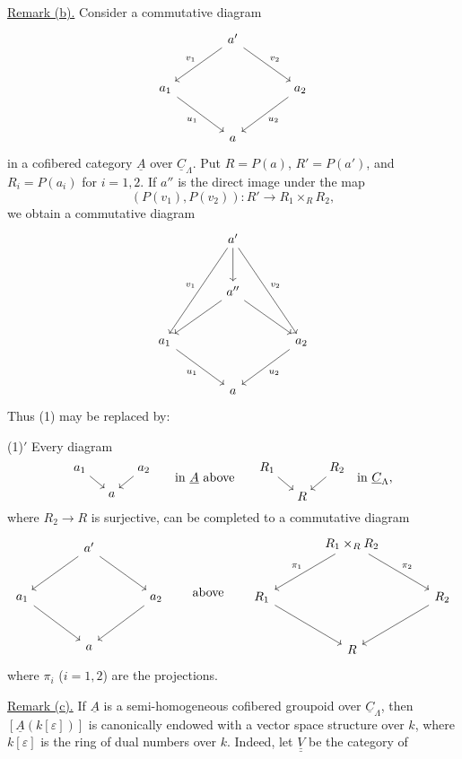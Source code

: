 \underline{Remark (b).} Consider a commutative diagram
\[
\begin{tikzcd}[row sep=large,column sep=large]
& a' \arrow[dl,"v_1"'] \arrow[dr,"v_2"] & \\
a_1 \arrow[dr,"u_1"'] & & a_2 \arrow[dl,"u_2"] \\
& a &
\end{tikzcd}
\]
in a cofibered category $\underline A$ over $\underline C_\Lambda$.
Put $R=P(a)$, $R'=P(a')$, and $R_i=P(a_i)$ for $i=1,2$. If $a''$ is
the direct image under the map
\[
 (P(v_1),P(v_2)):R'\longrightarrow R_1\times_RR_2,
\]
we obtain a commutative diagram
\[
\begin{tikzcd}[row sep=large,column sep=large]
& a' \arrow[d] \arrow[ddl,"v_1"'] \arrow[ddr,"v_2"] & \\
& a'' \arrow[dl] \arrow[dr] & \\
a_1 \arrow[dr,"u_1"'] & & a_2 \arrow[dl,"u_2"] \\
& a &
\end{tikzcd}
\]
Thus (1) may be replaced by:

(1)$'$ Every diagram
\[
\begin{tikzcd}[cramped,column sep=small,row sep=small]
a_1 \arrow[dr] & & a_2 \arrow[dl] \\
& a &
\end{tikzcd}
\qquad\text{in }\underline A\text{ above}\qquad
\begin{tikzcd}[cramped,column sep=small,row sep=small]
R_1 \arrow[dr] & & R_2 \arrow[dl] \\
& R &
\end{tikzcd}
\quad\text{in }\underline C_\Lambda,
\]
where $R_2\longrightarrow R$ is surjective, can be completed to a
commutative diagram
\[
\begin{tikzcd}[row sep=large,column sep=large]
& a' \arrow[dl] \arrow[dr] & \\
a_1 \arrow[dr] & & a_2 \arrow[dl] \\
& a &
\end{tikzcd}
\qquad\text{above}\qquad
\begin{tikzcd}[row sep=large,column sep=large]
& R_1\times_RR_2 \arrow[dl,"\pi_1"'] \arrow[dr,"\pi_2"] & \\
R_1 \arrow[dr] & & R_2 \arrow[dl] \\
& R &
\end{tikzcd}
\]
where $\pi_i$ ($i=1,2$) are the projections.

\underline{Remark (c).} If $\underline A$ is a semi-homogeneous
cofibered groupoid over $\underline C_\Lambda$, then
$[\underline A(k[\varepsilon])]$ is canonically endowed with a vector
space structure over $k$, where $k[\varepsilon]$ is the ring of dual
numbers over $k$. Indeed, let $\underline{\underline V}$ be the category
of


